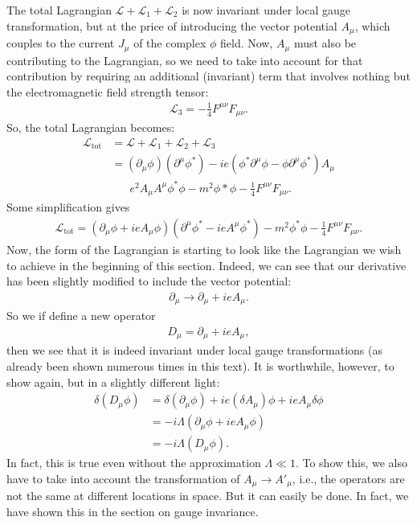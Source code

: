 \documentclass[a4paper,11pt]{article}
\numberwithin{equation}{section}
\theoremstyle{definition}
\newcommand{\p}{\partial}
\newcommand{\lag}{\mathcal{L}}
\begin{document}
The total Lagrangian $\lag + \lag_1 + \lag_2$ is now invariant under local gauge transformation, but at the price of introducing the vector potential $A_\mu$, which couples to the current $J_\mu$ of the complex $\phi$ field. Now, $A_\mu$ must also be contributing to the Lagrangian, so we need to take into account for that contribution by requiring an additional (invariant) term that involves nothing but the electromagnetic field strength tensor:
\begin{align}
\lag_3 = -\frac{1}{4}F^{\mu\nu}F_{\mu\nu}.
\end{align}
So, the total Lagrangian becomes:
\begin{align}
\lag_{\text{tot}} &= \lag+ \lag_1 + \lag_2 + \lag_3\\
&= (\p_\mu\phi)(\p^\mu\phi^*) -ie(\phi^*\p^\mu\phi - \phi\p^\mu\phi^*)A_\mu\\
&\,\,\,\,\,\,\,\,\,\, e^2A_\mu A^\mu \phi^*\phi - m^2 \phi*\phi - \frac{1}{4}F^{\mu\nu}F_{\mu\nu}.
\end{align}
Some simplification gives
\begin{align}
\lag_{\text{tot}} = (\p_\mu\phi + ieA_\mu\phi)(\p^\mu\phi^* - ieA^\mu\phi^*) - m^2\phi^*\phi - \frac{1}{4}F^{\mu\nu}F_{\mu\nu}.
\end{align}
Now, the form of the Lagrangian is starting to look like the Lagrangian we wish to achieve in the beginning of this section. Indeed, we can see that our derivative has been slightly modified to include the vector potential:
\begin{align}
\p_\mu \to \p_\mu + ieA_\mu.
\end{align}
So we if define a new operator
\begin{align}
D_\mu = \p_\mu + ieA_\mu,
\end{align}
then we see that it is indeed invariant under local gauge transformations (as already been shown numerous times in this text). It is worthwhile, however, to show again, but in a slightly different light:
\begin{align}
\delta(D_\mu\phi) &= \delta(\p_\mu\phi) + ie(\delta A_\mu)\phi + ieA_\mu\delta \phi\\
&= -i\Lambda (\p_\mu\phi + ieA_\mu\phi)\\
&= -i\Lambda (D_\mu\phi).
\end{align}
In fact, this is true even without the approximation $\Lambda \ll 1$. To show this, we also have to take into account the transformation of $A_\mu \to A'_\mu$, i.e., the operators are not the same at different locations in space. But it can easily be done. In fact, we have shown this in the section on gauge invariance. \\
\end{document}
